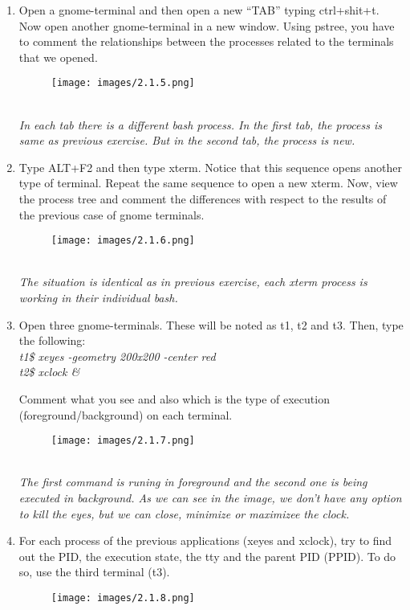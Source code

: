 \documentclass[12pt, titlepage,]{article}
\begin{document}
\begin{enumerate}
  \item Open a gnome-terminal and then open a new “TAB” typing ctrl+shit+t. Now open another gnome-terminal in a new window. Using pstree, you have to comment the relationships between the processes related to the terminals that we opened. 
    \begin{figure}[h] %
    \centering
    {\texttt{[image: images/2.1.5.png]}}
    \end{figure}
    \\\textit{\color{blue}In each tab there is a different bash process.
    In the first tab, the process is same as previous exercise. But in the second tab, the process is new. }
    \clearpage
    
  \item Type ALT+F2 and then type xterm. Notice that this sequence opens another type of terminal. Repeat the same sequence to open a new xterm. Now, view the process tree and comment the differences with respect to the results of the previous case of gnome terminals. 
  \begin{figure}[h] %
    \centering
    {\texttt{[image: images/2.1.6.png]}}
    \end{figure} \\
   \textit{\color{blue} The situation is identical as in previous exercise, each xterm process is working in their individual bash.}
  \item Open three gnome-terminals. These will be noted as t1, t2 and t3. Then, type the following: \\
  \textit{\color{gray}  t1\$ xeyes -geometry 200x200 -center red\\
    t2\$ xclock \&}

  
  Comment what you see and also which is the type of execution (foreground/background) on each terminal.\\
    \begin{figure}[h] %
    \centering
    {\texttt{[image: images/2.1.7.png]}}
    \end{figure} \\
  \textit{\color{blue} The first command is runing in foreground and the second one is being executed in background. As we can see in the image, we don't have any option to kill the eyes, but we can close, minimize or maximizee the clock.}    

    
  \item For each process of the previous applications (xeyes and xclock), try to find out the PID, the execution state, the tty and the parent PID (PPID). To do so, use the third terminal (t3). 
    \begin{figure}[h] %
    \centering
    {\texttt{[image: images/2.1.8.png]}}
    \end{figure} \\
    

\end{enumerate}
\end{document}
